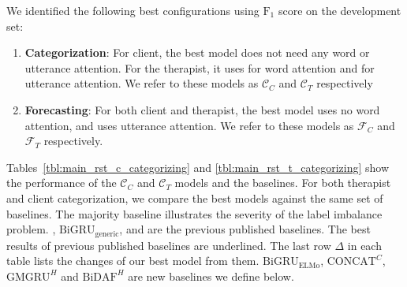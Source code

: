  We identified the following best configurations using $\text{F}_{1}$
score on the development set:
\begin{enumerate}[nosep]
\item {\bf Categorization}: For client, the best model does not need any
  word or utterance attention. For the therapist, it uses \GMGRUH
  for word attention and \anchor for utterance attention. We refer
  to these models as $\mathcal{C}_C$ and $\mathcal{C}_T$ respectively
\item {\bf Forecasting}: For both client and  therapist, the best
  model uses no word attention, and uses \self utterance
  attention. We refer to these models as $\mathcal{F}_C$ and
  $\mathcal{F}_T$ respectively.
\end{enumerate}

Tables~\ref{tbl:main_rst_c_categorizing} and
\ref{tbl:main_rst_t_categorizing} show the performance of the
$\mathcal{C}_C$ and $\mathcal{C}_T$ models and the baselines.
%
For both therapist and client categorization, we compare the best
models against the same set of baselines. The majority baseline
illustrates the severity of the label imbalance
problem. \citet{xiao2016behavioral}, $\text{BiGRU}_{\text{generic}}$,
\citet{can2015dialog} and \citet{tanana2016comparison} are the
previous published baselines. The best results of previous published
baselines are underlined. The last row
$\Delta$ in each table lists the changes of our best model from
them. $\text{BiGRU}_{\text{ELMo}}$, $\text{CONCAT}^{C}$,
$\text{GMGRU}^{H}$ and $\text{BiDAF}^{H}$ are new baselines
we define below.

